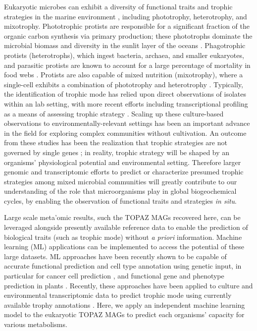 \documentclass[12pt]{article}
\numberwithin{equation}{section}
\begin{document}
Eukaryotic microbes can exhibit a diversity of functional traits and trophic strategies in the marine environment \citep{Worden2015,Caron2011Marine}, including phototrophy, heterotrophy, and mixotrophy. Phototrophic protists are responsible for a significant fraction of the organic carbon synthesis via primary production; these phototrophs dominate the microbial biomass and diversity in the sunlit layer of the oceans \citep{Worden2015,de_Vargas_2015}. Phagotrophic protists (heterotrophs), which ingest bacteria, archaea, and smaller eukaryotes, and parasitic protists are known to account for a large percentage of mortality in food webs \citep{Sherr_2002, Caron2011Marine, Worden2015}. Protists are also capable of mixed nutrition (mixotrophy), where a single-cell exhibits a combination of phototrophy and heterotrophy \citep{Stoecker_2017}. Typically, the identification of trophic mode has relied upon direct observations of isolates within an lab setting, with more recent efforts including transcriptional profiling as a means of assessing trophic strategy \citep{Keeling2014, Liu_2016}. Scaling up these culture-based observations to environmentally-relevant settings \citep{Alexander2015a, hu2018,Gong_2016} has been an important advance in the field for exploring complex communities without cultivation. An outcome from these studies has been the realization that trophic strategies are not governed by single genes \citep{Labarre_2020}; in reality, trophic strategy will be shaped by an organisms' physiological potential and environmental setting. Therefore larger genomic and transcriptomic efforts to predict or characterize presumed trophic strategies among mixed microbial communities will greatly contribute to our understanding of the role that microorganisms play in global biogeochemical cycles, by enabling the observation of functional traits and strategies \textit{in situ}. 

Large scale meta'omic results, such the TOPAZ MAGs recovered here, can be leveraged alongside presently available reference data to enable the prediction of biological traits (such as trophic mode) without \textit{a priori} information. Machine learning (ML) applications can be implemented to access the potential of these large datasets. ML approaches have been recently shown to be capable of accurate functional prediction and cell type annotation using genetic input, in particular for cancer cell prediction \citep{shipp2002diffuse,bashiri2017improving,tabl2019machine}, and functional gene and phenotype prediction in plants \citep{mahood2020machine}. Recently, these approaches have been applied to culture and environmental transcriptomic data to predict trophic mode using currently available trophy annotations \citep{lambert2021dynamic, burns2018gene,Jimenez_2021}. Here, we apply an independent machine learning model to the eukaryotic TOPAZ MAGs to predict each organisms' capacity for various metabolisms.
\end{document}
